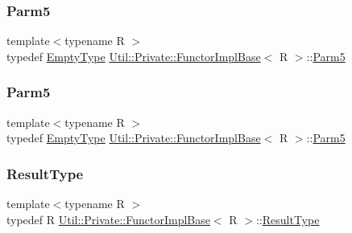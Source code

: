 \mbox{\label{structUtil_1_1Private_1_1FunctorImplBase_ac5b1d132e854e4f9fd6fb1e43313fa26}} 
\subsubsection{\texorpdfstring{Parm5}{Parm5}\hspace{0.1cm}{\footnotesize\ttfamily [2/3]}}
{\footnotesize\ttfamily template$<$typename R $>$ \\
typedef \mbox{\hyperlink{classUtil_1_1EmptyType}{Empty\+Type}} \mbox{\hyperlink{structUtil_1_1Private_1_1FunctorImplBase}{Util\+::\+Private\+::\+Functor\+Impl\+Base}}$<$ R $>$\+::\mbox{\hyperlink{structUtil_1_1Private_1_1FunctorImplBase_ac5b1d132e854e4f9fd6fb1e43313fa26}{Parm5}}}

\mbox{\label{structUtil_1_1Private_1_1FunctorImplBase_ac5b1d132e854e4f9fd6fb1e43313fa26}} 
\subsubsection{\texorpdfstring{Parm5}{Parm5}\hspace{0.1cm}{\footnotesize\ttfamily [3/3]}}
{\footnotesize\ttfamily template$<$typename R $>$ \\
typedef \mbox{\hyperlink{classUtil_1_1EmptyType}{Empty\+Type}} \mbox{\hyperlink{structUtil_1_1Private_1_1FunctorImplBase}{Util\+::\+Private\+::\+Functor\+Impl\+Base}}$<$ R $>$\+::\mbox{\hyperlink{structUtil_1_1Private_1_1FunctorImplBase_ac5b1d132e854e4f9fd6fb1e43313fa26}{Parm5}}}

\mbox{\label{structUtil_1_1Private_1_1FunctorImplBase_a5e95fd30fdd89f3c5080b68ab5891bc3}} 
\subsubsection{\texorpdfstring{ResultType}{ResultType}\hspace{0.1cm}{\footnotesize\ttfamily [1/3]}}
{\footnotesize\ttfamily template$<$typename R $>$ \\
typedef R \mbox{\hyperlink{structUtil_1_1Private_1_1FunctorImplBase}{Util\+::\+Private\+::\+Functor\+Impl\+Base}}$<$ R $>$\+::\mbox{\hyperlink{structUtil_1_1Private_1_1FunctorImplBase_a5e95fd30fdd89f3c5080b68ab5891bc3}{Result\+Type}}}


